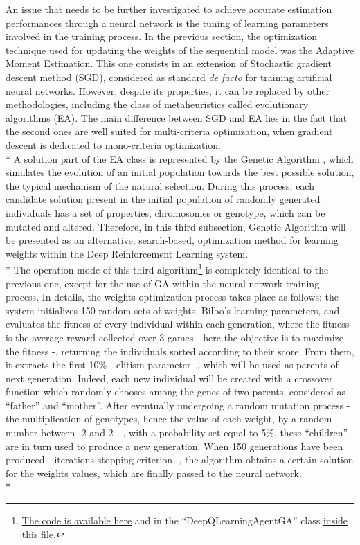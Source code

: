 An issue that needs to be further investigated to achieve accurate estimation performances through a neural network is the tuning of learning parameters involved in the training process. In the previous section, the optimization technique used for updating the weights of the sequential model was the Adaptive Moment Estimation. This one consists in an extension of Stochastic gradient descent method (SGD), considered as standard \textit{de facto} for training artificial neural networks. However, despite its properties, it can be replaced by other methodologies, including the class of metaheuristics called evolutionary algorithms (EA). The main difference between SGD and EA lies in the fact that the second ones are well suited for multi-criteria optimization, when gradient descent is dedicated to mono-criteria optimization.\\*
A solution part of the EA class is represented by the Genetic Algorithm \cite{7}, which simulates the evolution of an initial population towards the best possible solution, the typical mechanism of the natural selection. During this process, each candidate solution present in the initial population of randomly generated individuals has a set of properties, chromosomes or genotype, which can be mutated and altered. 
Therefore, in this third subsection, Genetic Algorithm will be presented as an alternative, search-based, optimization method for learning weights within the Deep Reinforcement Learning system.\\*
The operation mode of this third algorithm\footnote{\href{https://github.com/moiraghif/DragonHunting/blob/master/Bilbo\%20World/Bilbo_ga_deep_feels.py}{The code is available here} and in the ``DeepQLearningAgentGA'' class \href{https://github.com/moiraghif/DragonHunting/blob/master/Bilbo\%20World/agents.py}{inside this file.}} is completely identical to the previous one, except for the use of GA within the neural network training process. In details, the weights optimization process takes place as follows: the system initializes 150 random sets of weights, Bilbo's learning parameters, and evaluates the fitness of every individual within each generation, where the fitness is the average reward collected over 3 games - here the objective is to maximize the fitness -, returning the individuals sorted according to their score. From them, it extracts the first 10\% - elitism parameter -, which will be used as parents of next generation. Indeed, each new individual will be created with a crossover function which randomly chooses among the genes of two parents, considered as ``father'' and ``mother''. After eventually undergoing a random mutation process - the multiplication of genotypes, hence the value of each weight, by a random number between -2 and 2 - , with a probability set equal to 5\%, these ``children'' are in turn used to produce a new generation. When 150 generations have been produced - iterations stopping criterion -, the algorithm obtains a certain solution for the weights values, which are finally passed to the neural network. \\*
